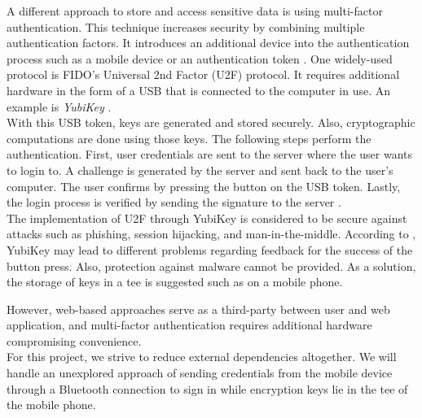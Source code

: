 A different approach to store and access sensitive data is using multi-factor authentication. This technique increases security by combining multiple authentication factors. It introduces an additional device into the authentication process such as a mobile device or an authentication token \cite{JacommeK18}. One widely-used protocol is FIDO's Universal 2nd Factor (U2F) protocol. It requires additional hardware in the form of a USB that is connected to the computer in use. An example is \textit{YubiKey} \cite{Yubikey}. \\
With this USB token, keys are generated and stored securely. Also, cryptographic computations are done using those keys. The following steps perform the authentication. First, user credentials are sent to the server where the user wants to login to. A challenge is generated by the server and sent back to the user's computer. The user confirms by pressing the button on the USB token. Lastly, the login process is verified by sending the signature to the server \cite{JacommeK18}. \\
The implementation of U2F through YubiKey is considered to be secure against attacks such as phishing, session hijacking, and man-in-the-middle. According to \cite{JacommeK18}, YubiKey may lead to different problems regarding feedback for the success of the button press. Also, protection against malware cannot be provided. As a solution, the storage of keys in a \gls{tee} is suggested such as on a mobile phone.

However, web-based approaches serve as a third-party between user and web application, and multi-factor authentication requires additional hardware compromising convenience. \\
For this project, we strive to reduce external dependencies altogether. We will handle an unexplored approach of sending credentials from the mobile device through a Bluetooth connection to sign in while encryption keys lie in the \gls{tee} of the mobile phone.
